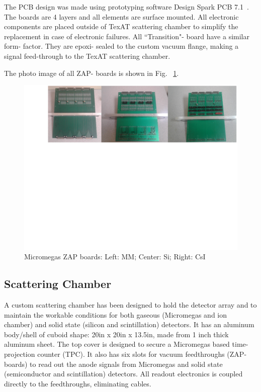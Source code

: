 \documentclass[final,number,sort&compress,5p,times,twocolumn]{elsarticle}
\begin{document}
The PCB design was made using prototyping software  Design Spark PCB 7.1~\cite{DesignSpark}. The boards are 4 layers and all elements are surface mounted.  
 All electronic components are placed outside of TexAT scattering chamber to simplify the replacement in case of electronic failures. All
  ``Transition"-  board have a similar form- factor. They are  epoxi- sealed to the custom vacuum flange, making a signal feed-through 
  to the TexAT scattering chamber.  

The photo image of all ZAP- boards is shown in  Fig. ~\ref{fig:ZAP_All_Crop}.
		                                       
\begin{figure}
    \centering
     \includegraphics[width=\textwidth]{Figs/ZAP_All_Crop}
    \caption{Micromegas ZAP boards: Left: MM; Center: Si; Right: CsI}
      \label{fig:ZAP_All_Crop}
\end{figure}

\subsection{Scattering Chamber}

A custom scattering chamber  has been designed to hold the detector array and to maintain the workable conditions for both gaseous (Micromegas and ion chamber) and solid state (silicon and scintillation) detectors. It has an aluminum body/shell of cuboid shape: 20in x 20in x 13.5in, made from 1 inch thick aluminum sheet. The top cover is designed to secure a Micromegas based time-projection counter (TPC). It also has six slots for vacuum feedthroughs (ZAP-boards) to read out the anode signals from  Micromegas and solid state (semiconductor and scintillation) detectors. All readout electronics is coupled directly to the feedthroughs, eliminating cables. 
	
\end{document}
